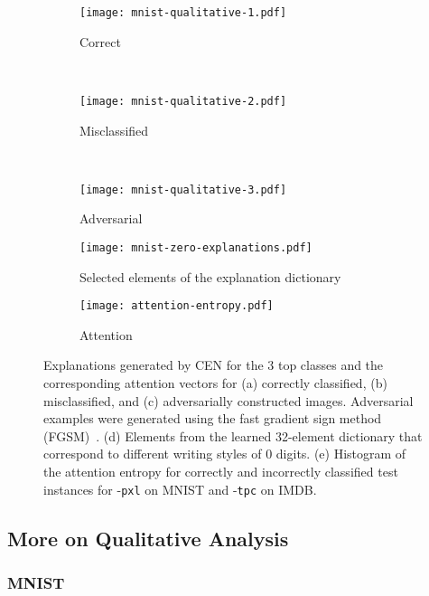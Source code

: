 \documentclass[twoside,11pt]{article}
\begin{document}
\begin{figure}[ht]
\begin{subfigure}[b]{0.3308\linewidth}
    \texttt{[image: mnist-qualitative-1.pdf]}\caption{Correct}\label{fig:mnist-qualitative-correct}
\end{subfigure}
~
\begin{subfigure}[b]{0.3\linewidth}
    \texttt{[image: mnist-qualitative-2.pdf]}\caption{Misclassified}\label{fig:mnist-qualitative-incorrect}
\end{subfigure}
~
\begin{subfigure}[b]{0.3265\linewidth}
    \texttt{[image: mnist-qualitative-3.pdf]}\caption{Adversarial}\label{fig:mnist-qualitative-adversarial}
\end{subfigure}
\begin{subfigure}[b]{0.55\linewidth}
    \texttt{[image: mnist-zero-explanations.pdf]}\caption{Selected elements of the explanation dictionary}\label{fig:mnist-zero-explanations}
\end{subfigure}\begin{subfigure}[b]{0.45\linewidth}
    \texttt{[image: attention-entropy.pdf]}\caption{Attention}\label{fig:attention-entropy}
\end{subfigure}
\caption{Explanations generated by CEN for the 3 top classes and the corresponding attention vectors for (a) correctly classified, (b) misclassified, and (c) adversarially constructed images.
Adversarial examples were generated using the fast gradient sign method (FGSM)~\citep{papernot2016practical}.
(d) Elements from the learned 32-element dictionary that correspond to different writing styles of 0 digits.
(e) Histogram of the attention entropy for correctly and incorrectly classified test instances for {\CEN}-\texttt{pxl} on MNIST and {\CEN}-\texttt{tpc} on IMDB.
}\label{fig:mnist-plots}
\end{figure}
 
\subsection{More on Qualitative Analysis}
\label{app:qualitative-analysis}

\subsubsection{MNIST}
\end{document}
